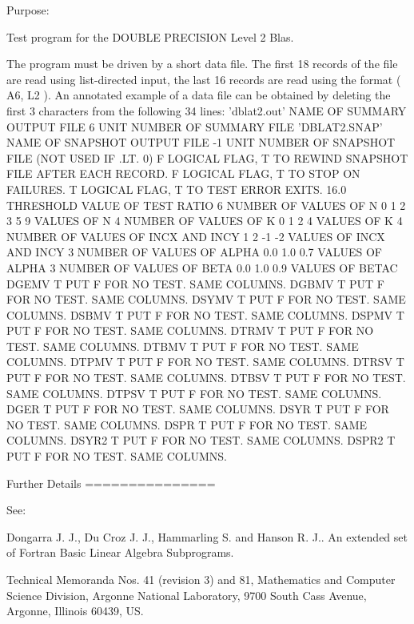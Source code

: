 \begin{DoxyParagraph}{Purpose\+: }
\begin{DoxyVerb} Test program for the DOUBLE PRECISION Level 2 Blas.

 The program must be driven by a short data file. The first 18 records
 of the file are read using list-directed input, the last 16 records
 are read using the format ( A6, L2 ). An annotated example of a data
 file can be obtained by deleting the first 3 characters from the
 following 34 lines:
 'dblat2.out'      NAME OF SUMMARY OUTPUT FILE
 6                 UNIT NUMBER OF SUMMARY FILE
 'DBLAT2.SNAP'     NAME OF SNAPSHOT OUTPUT FILE
 -1                UNIT NUMBER OF SNAPSHOT FILE (NOT USED IF .LT. 0)
 F        LOGICAL FLAG, T TO REWIND SNAPSHOT FILE AFTER EACH RECORD.
 F        LOGICAL FLAG, T TO STOP ON FAILURES.
 T        LOGICAL FLAG, T TO TEST ERROR EXITS.
 16.0     THRESHOLD VALUE OF TEST RATIO
 6                 NUMBER OF VALUES OF N
 0 1 2 3 5 9       VALUES OF N
 4                 NUMBER OF VALUES OF K
 0 1 2 4           VALUES OF K
 4                 NUMBER OF VALUES OF INCX AND INCY
 1 2 -1 -2         VALUES OF INCX AND INCY
 3                 NUMBER OF VALUES OF ALPHA
 0.0 1.0 0.7       VALUES OF ALPHA
 3                 NUMBER OF VALUES OF BETA
 0.0 1.0 0.9       VALUES OF BETAC
 DGEMV  T PUT F FOR NO TEST. SAME COLUMNS.
 DGBMV  T PUT F FOR NO TEST. SAME COLUMNS.
 DSYMV  T PUT F FOR NO TEST. SAME COLUMNS.
 DSBMV  T PUT F FOR NO TEST. SAME COLUMNS.
 DSPMV  T PUT F FOR NO TEST. SAME COLUMNS.
 DTRMV  T PUT F FOR NO TEST. SAME COLUMNS.
 DTBMV  T PUT F FOR NO TEST. SAME COLUMNS.
 DTPMV  T PUT F FOR NO TEST. SAME COLUMNS.
 DTRSV  T PUT F FOR NO TEST. SAME COLUMNS.
 DTBSV  T PUT F FOR NO TEST. SAME COLUMNS.
 DTPSV  T PUT F FOR NO TEST. SAME COLUMNS.
 DGER   T PUT F FOR NO TEST. SAME COLUMNS.
 DSYR   T PUT F FOR NO TEST. SAME COLUMNS.
 DSPR   T PUT F FOR NO TEST. SAME COLUMNS.
 DSYR2  T PUT F FOR NO TEST. SAME COLUMNS.
 DSPR2  T PUT F FOR NO TEST. SAME COLUMNS.

 Further Details
 ===============

    See:

       Dongarra J. J., Du Croz J. J., Hammarling S.  and Hanson R. J..
       An  extended  set of Fortran  Basic Linear Algebra Subprograms.

       Technical  Memoranda  Nos. 41 (revision 3) and 81,  Mathematics
       and  Computer Science  Division,  Argonne  National Laboratory,
       9700 South Cass Avenue, Argonne, Illinois 60439, US.


\end{DoxyVerb}
\end{DoxyParagraph}
